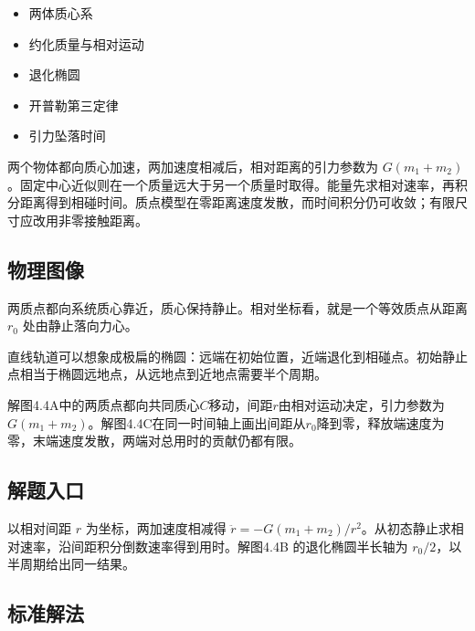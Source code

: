 \documentclass[UTF8,fontset=fandol,a4paper,11pt]{ctexart}
\providecommand{\tightlist}{\setlength{\itemsep}{0pt}\setlength{\parskip}{0pt}}
\begin{document}
\begin{itemize}
\tightlist
\item
  两体质心系
\item
  约化质量与相对运动
\item
  退化椭圆
\item
  开普勒第三定律
\item
  引力坠落时间
\end{itemize}

两个物体都向质心加速，两加速度相减后，相对距离的引力参数为 $G(m_1+m_2)$。固定中心近似则在一个质量远大于另一个质量时取得。能量先求相对速率，再积分距离得到相碰时间。质点模型在零距离速度发散，而时间积分仍可收敛；有限尺寸应改用非零接触距离。




\subsection*{物理图像}

两质点都向系统质心靠近，质心保持静止。相对坐标看，就是一个等效质点从距离
\(r_0\) 处由静止落向力心。

直线轨道可以想象成极扁的椭圆：远端在初始位置，近端退化到相碰点。初始静止点相当于椭圆远地点，从远地点到近地点需要半个周期。

解图4.4A中的两质点都向共同质心$C$移动，间距$r$由相对运动决定，引力参数为$G(m_1+m_2)$。解图4.4C在同一时间轴上画出间距从$r_0$降到零，释放端速度为零，末端速度发散，两端对总用时的贡献仍都有限。



\subsection*{解题入口}

以相对间距 $r$ 为坐标，两加速度相减得 $\ddot r=-G(m_1+m_2)/r^2$。从初态静止求相对速率，沿间距积分倒数速率得到用时。解图4.4B 的退化椭圆半长轴为 $r_0/2$，以半周期给出同一结果。



\subsection*{标准解法}
\end{document}
